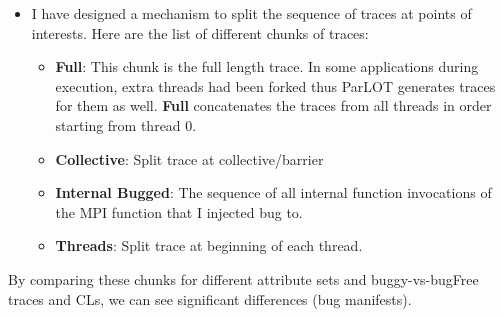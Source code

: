 \begin{itemize}
\begin{itemize}
	\end{itemize}
\item I have designed a mechanism to split the sequence of traces at points of interests. Here are the list of different chunks of traces:
	\begin{itemize}
	\item \textbf{Full}: This chunk is the full length trace. In some applications during execution, extra threads had been forked thus ParLOT generates traces for them as well. \textbf{Full} concatenates the traces from all threads in order starting from thread 0.
	\item \textbf{Collective}: Split trace at collective/barrier
	\item \textbf{Internal Bugged}: The sequence of all internal function invocations of the MPI function that I injected bug to.
	\item \textbf{Threads}: Split trace at beginning of each thread.
	\end{itemize}
\end{itemize}
By comparing these chunks for different attribute sets and buggy-vs-bugFree traces and CLs, we can see significant differences (bug manifests).